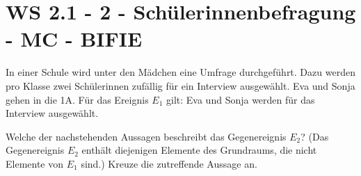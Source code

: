 \section{WS 2.1 - 2 - Schülerinnenbefragung - MC - BIFIE}

\begin{beispiel}[WS 2.1]{1} %
In einer Schule wird unter den Mädchen eine Umfrage durchgeführt. Dazu werden pro Klasse
zwei Schülerinnen zufällig für ein Interview ausgewählt. Eva und Sonja gehen in die 1A.
Für das Ereignis $E_1$ gilt: Eva und Sonja werden für das Interview ausgewählt. \leer

Welche der nachstehenden Aussagen beschreibt das Gegenereignis $E_2$? (Das Gegenereignis
$E_2$ enthält diejenigen Elemente des Grundraums, die nicht Elemente von $E_1$ sind.)
Kreuze die zutreffende Aussage an.

\end{beispiel}